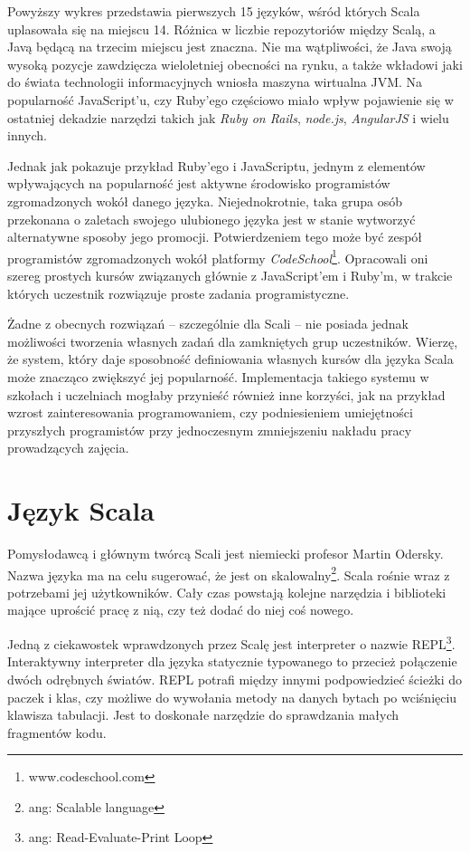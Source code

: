 \documentclass[brudnopis]{xmgr}
\begin{document}
Powyższy wykres przedstawia pierwszych 15 języków, wśród których Scala uplasowała się na miejscu 14. Różnica w liczbie repozytoriów między Scalą, a Javą będącą na trzecim miejscu jest znaczna. Nie ma wątpliwości, że Java swoją wysoką pozycje zawdzięcza wieloletniej obecności na rynku, a także wkładowi jaki do świata technologii informacyjnych wniosła maszyna wirtualna JVM. Na popularność JavaScript'u, czy Ruby'ego częściowo miało wpływ pojawienie się w ostatniej dekadzie narzędzi takich jak \textit{Ruby on Rails}, \textit{node.js}, \textit{AngularJS} i wielu innych. 

Jednak jak pokazuje przykład Ruby'ego i JavaScriptu, jednym z elementów wpływających na popularność jest aktywne środowisko programistów zgromadzonych wokół danego języka. Niejednokrotnie, taka grupa osób przekonana o zaletach swojego ulubionego języka jest w stanie wytworzyć alternatywne sposoby jego promocji. Potwierdzeniem tego może być zespół programistów zgromadzonych wokół platformy \textit{CodeSchool}\footnote{www.codeschool.com}. Opracowali oni szereg prostych kursów związanych głównie z JavaScript'em i Ruby'm, w trakcie których uczestnik rozwiązuje proste zadania programistyczne. 

Żadne z obecnych rozwiązań -- szczególnie dla Scali -- nie posiada jednak możliwości tworzenia własnych zadań dla zamkniętych grup uczestników. Wierzę, że system, który daje sposobność definiowania własnych kursów dla języka Scala może znacząco zwiększyć jej popularność. Implementacja takiego systemu w szkołach i uczelniach mogłaby przynieść również inne korzyści, jak na przykład wzrost zainteresowania programowaniem, czy podniesieniem umiejętności przyszłych programistów przy jednoczesnym zmniejszeniu nakładu pracy prowadzących zajęcia.

\section{Język Scala}

Pomysłodawcą i głównym twórcą Scali jest niemiecki profesor Martin Odersky. Nazwa języka ma na celu sugerować, że jest on skalowalny\footnote{ang: Scalable language}. Scala rośnie wraz z potrzebami jej użytkowników. Cały czas powstają kolejne narzędzia i biblioteki mające uprościć pracę z nią, czy też dodać do niej coś nowego. 

Jedną z ciekawostek wprawdzonych przez Scalę jest interpreter o nazwie REPL\footnote{ang: Read-Evaluate-Print Loop}. Interaktywny interpreter dla języka statycznie typowanego to przecież połączenie dwóch odrębnych światów. REPL potrafi między innymi podpowiedzieć ścieżki do paczek i klas, czy możliwe do wywołania metody na danych bytach po wciśnięciu klawisza tabulacji. Jest to doskonałe narzędzie do sprawdzania małych fragmentów kodu.
\end{document}
